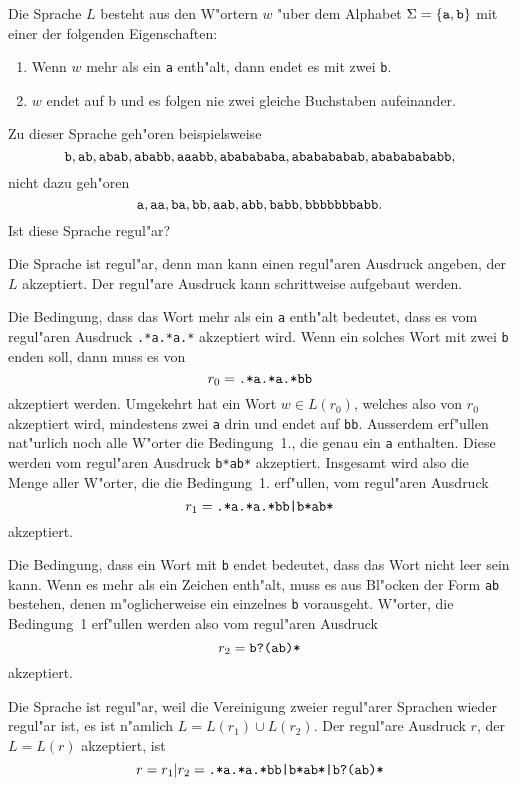 Die Sprache $L$ besteht aus den W"ortern $w$ "uber dem Alphabet
$\Sigma=\{\text{\tt a},\text{\tt b}\}$ mit einer der folgenden Eigenschaften:
\begin{enumerate}
\item Wenn $w$ mehr als ein {\tt a} enth"alt, dann endet es mit zwei {\tt b}.
\item $w$ endet auf {\text b} und es folgen nie zwei gleiche
Buchstaben aufeinander.
\end{enumerate}
Zu dieser Sprache geh"oren beispielsweise
\[
\text{\tt b},
\text{\tt ab},
\text{\tt abab},
\text{\tt ababb},
\text{\tt aaabb},
\text{\tt ababababa},
\text{\tt ababababab},
\text{\tt abababababb},
\]
nicht dazu geh"oren
\[
\text{\tt a},
\text{\tt aa},
\text{\tt ba},
\text{\tt bb},
\text{\tt aab},
\text{\tt abb},
\text{\tt babb},
\text{\tt bbbbbbbabb}.
\]
Ist diese Sprache regul"ar?

\begin{loesung}
Die Sprache ist regul"ar, denn man kann einen regul"aren Ausdruck
angeben, der $L$ akzeptiert. Der regul"are Ausdruck kann schrittweise
aufgebaut werden.

Die Bedingung, dass das Wort mehr als ein {\tt a} enth"alt bedeutet,
dass es vom regul"aren Ausdruck {\tt .*a.*a.*} akzeptiert wird. Wenn
ein solches Wort mit zwei {\tt b} enden soll, dann muss es von
\[
r_0=\text{\tt .*a.*a.*bb}
\]
akzeptiert werden.
Umgekehrt hat ein Wort $w\in L(r_0)$, welches also von $r_0$ akzeptiert
wird, mindestens zwei {\tt a} drin und endet auf {\tt bb}.
Ausserdem erf"ullen nat"urlich noch alle W"orter
die Bedingung~1., die genau ein {\tt a} enthalten. Diese werden
vom regul"aren Ausdruck {\tt b*ab*} akzeptiert. Insgesamt wird also die
Menge aller W"orter, die die Bedingung~1. erf"ullen, vom regul"aren
Ausdruck
\[
r_1=\text{\tt .*a.*a.*bb|b*ab*}
\]
akzeptiert.

Die Bedingung, dass ein Wort mit {\tt b} endet bedeutet, dass das Wort
nicht leer sein kann. Wenn es mehr als ein Zeichen enth"alt, muss es
aus Bl"ocken der Form {\tt ab} bestehen, denen m"oglicherweise ein
einzelnes {\tt b} vorausgeht. W"orter, die Bedingung~1 erf"ullen werden
also vom regul"aren Ausdruck
\[
r_2=\text{\tt b?(ab)*}
\]
akzeptiert.

Die Sprache ist regul"ar, weil die Vereinigung zweier regul"arer Sprachen
wieder regul"ar ist, es ist n"amlich $L=L(r_1)\cup L(r_2)$. Der regul"are
Ausdruck $r$, der $L=L(r)$ akzeptiert, ist
\[
r=r_1|r_2 =
\text{\tt .*a.*a.*bb|b*ab*|b?(ab)*}
\]
\end{loesung}
